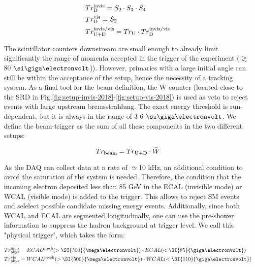 \begin{equation}
\label{eq:trigger-downstream}
\begin{split}      
& Tr^{\rm{invis}}_{\rm{D}} = S_2 \cdot S_3 \cdot S_4 \\
& Tr^{\rm{vis}}_{\rm{D}} = S_2 \\
& Tr^{\rm{invis/vis}}_{\rm{U}+\rm{D}} = Tr_{\rm{U}} \cdot Tr^{\rm{invis/vis}}_{\rm{D}}
\end{split}
\end{equation}

The scintillator counters downstream are small enough to already limit significantly the range of momenta accepted in the trigger of the experiment ($\gtrsim$ 80 $\gev$)). However, primaries with a large initial angle can still be within the acceptance of the setup, hence the
necessity of a tracking system. As a final tool for the beam definition, the W counter (located close to the SRD in Fig.\ref{fig:setup-invis-2018}-\ref{fig:setup-vis-2018}) is used as veto to reject events with large upstream bremsstrahlung. The exact energy threshold is run-dependent, but it is always in the range of 3-6 $\gev$. We define the beam-trigger as the sum of all these components in the two different setups:

\begin{equation}
\label{eq:trigger-beam}
Tr_{\rm{beam}} = Tr_{\rm{U}+\rm{D}} \cdot \bar{W}
\end{equation}

As the DAQ can collect data at a rate of $\simeq$10 \si{kHz}, an additional condition to avoid the saturation of the system is needed. Therefore, the condition that the incoming electron deposited less than 85 GeV in the ECAL (invisible mode) or WCAL (visible mode) is added to the trigger. This allows to reject SM events and selelect possible candidate missing energy events. Additionally, since both WCAL and ECAL are segmented longitudinally, one can use the pre-shower information to suppress the hadron background at trigger level. We call this "physical trigger", which takes the form:

\begin{equation}
\label{eq:trigger-phys}
\begin{split}
& Tr^{\rm{invis}}_{\rm{phys}} = ECAL^{\rm{presh}}(> \SI{300}{\mega\electronvolt}) \cdot ECAL(<\SI{85}{\giga\electronvolt})\\
& Tr^{\rm{vis}}_{\rm{phys}} = WCAL^{\rm{presh}}(>\SI{500}{\mega\electronvolt}) \cdot WCAL(<\SI{110}{\giga\electronvolt})
\end{split}
\end{equation}

